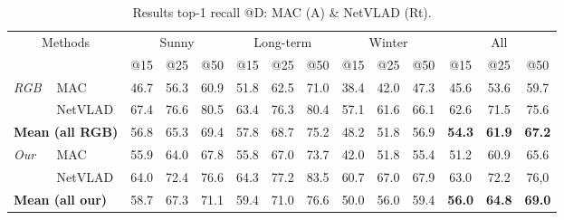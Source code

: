 {
\setlength{\tabcolsep}{1.3pt}
\renewcommand{\arraystretch}{1.2}
\begin{table}
	\caption{\label{tab/sum_res} Results top-1 recall @D: MAC (A) \& NetVLAD (Rt).}
	\scriptsize \center
	\begin{tabular}{l l | c c c | c c c | c c c | c c c}
	\multicolumn{2}{c|}{\multirow{2}{0.8cm}{Methods}} & \multicolumn{3}{c|}{Sunny} & \multicolumn{3}{c|}{Long-term} & \multicolumn{3}{c|}{Winter} & \multicolumn{3}{c}{All} \\
	 	&	  & @15   & @25   & @50   & @15   & @25  & @50   & @15   & @25   & @50   & @15 & @25 & @50 \\
	\hline
	\multirow{2}{0.5cm}{\textit{RGB}} & MAC  & 46.7 & 56.3 & 60.9 & 51.8 & 62.5 & 71.0 & 38.4 & 42.0 & 47.3 & 45.6 & 53.6 & 59.7 \\
									 & NetVLAD   & 67.4 & 76.6 & 80.5 & 63.4 & 76.3 & 80.4 & 57.1 & 61.6 & 66.1 & 62.6 & 71.5 & 75.6 \\
	\multicolumn{2}{l|}{\textbf{Mean (all RGB)}} & 56.8 & 65.3 & 69.4 & 57.8 & 68.7 & 75.2 & 48.2 & 51.8 & 56.9 & \textbf{54.3} & \textbf{61.9} & \textbf{67.2} \\
	\hline
	\multirow{2}{0.5cm}{\textit{Our}} &		MAC  & 55.9 & 64.0 &	67.8 & 55.8 & 67.0 & 73.7 &	42.0 & 51.8 & 55.4 & 51.2 & 60.9 & 65.6 \\
									& 	NetVLAD & 64.0 & 72.4 &	76.6 & 64.3 & 77.2 & 83.5 & 60.7 & 67.0 & 67.9 & 63.0 & 72.2 & 76,0 \\	
	\multicolumn{2}{l|}{\textbf{Mean (all our)}} 	& 58.7 & 67.3 & 71.1 & 59.4 & 71.0 & 76.6 & 50.0 & 56.0 & 59.4 & \textbf{56.0} & \textbf{64.8} & \textbf{69.0} \\	
	
	\end{tabular}
	\vspace{-0.25cm}
\end{table}
}